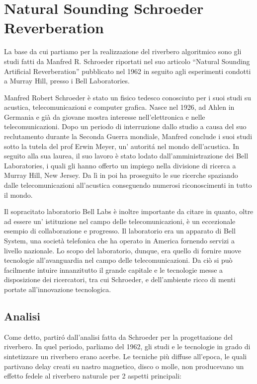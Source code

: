 \section{Natural Sounding Schroeder Reverberation}

La base da cui partiamo per la realizzazione del riverbero algoritmico sono gli studi fatti da Manfred R. Schroeder riportati nel suo articolo “Natural Sounding Artificial Reverberation” pubblicato nel 1962 in seguito agli esperimenti condotti a Murray Hill, presso i Bell Laboratories.

Manfred Robert Schroeder è stato un fisico tedesco conosciuto per i suoi studi su acustica, telecomunicazioni e computer grafica. Nasce nel 1926, ad Ahlen in Germania e già da giovane mostra interesse nell’elettronica e nelle telecomunicazioni. Dopo un periodo di interruzione dallo studio a causa del suo reclutamento durante la Seconda Guerra mondiale, Manfred conclude i suoi studi sotto la tutela del prof Erwin Meyer, un’ autoritá nel mondo dell’acustica.
In seguito alla sua laurea, il suo lavoro è stato lodato dall’amministrazione dei Bell Laboratories, i quali gli hanno offerto un impiego nella divisione di ricerca a Murray Hill, New Jersey. Da lì in poi ha proseguito le sue ricerche spaziando dalle telecomunicazioni all’acustica conseguendo numerosi riconoscimenti in tutto il mondo.

Il sopracitato laboratorio Bell Labs è inoltre importante da citare in quanto, oltre ad essere un’ istituzione nel campo delle telecomunicazioni, è un eccezionale esempio di collaborazione e progresso. Il laboratorio era un apparato di Bell System, una società telefonica che ha operato in America fornendo servizi a livello nazionale. Lo scopo del laboratorio, dunque, era quello di fornire nuove tecnologie all’avanguardia nel campo delle telecomunicazioni. Da ciò si può facilmente intuire innanzitutto il grande capitale e le tecnologie messe a disposizione dei ricercatori, tra cui Schroeder, e dell’ambiente ricco di menti portate all’innovazione tecnologica.

\subsection{Analisi}

Come detto, partiró dall’analisi fatta da Schroeder per la progettazione del riverbero.
In quel periodo, parliamo del 1962, gli studi e le tecnologie in grado di sintetizzare un riverbero erano acerbe.
Le tecniche più diffuse all’epoca, le quali partivano delay creati su nastro magnetico, disco o molle, non producevano un effetto fedele al riverbero naturale per 2 aspetti principali:

